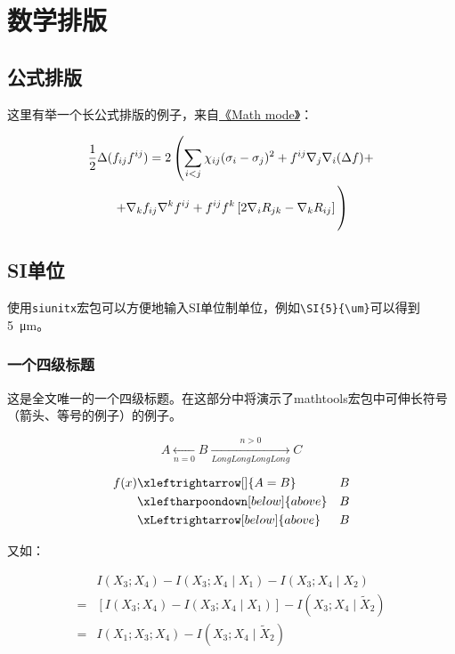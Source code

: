 \documentclass[doctor,openright,twoside]{sjtuthesis}
\theoremstyle{plain}
\theoremstyle{definition}
\theoremstyle{remark}
\theoremstyle{ocrenumbox}
\theoremstyle{plain}
\begin{document}
\section{数学排版}
\label{sec:matheq}

\subsection{公式排版}
\label{sec:eqformat}

这里有举一个长公式排版的例子，来自\href{http://www.tex.ac.uk/tex-archive/info/math/voss/mathmode/Mathmode.pdf}{《Math mode》}：

\begin {multline}
  \frac {1}{2}\Delta (f_{ij}f^{ij})=
  2\left (\sum _{i<j}\chi _{ij}(\sigma _{i}-
    \sigma _{j}) ^{2}+ f^{ij}\nabla _{j}\nabla _{i}(\Delta f)+\right .\\
  \left .+\nabla _{k}f_{ij}\nabla ^{k}f^{ij}+
    f^{ij}f^{k}\left [2\nabla _{i}R_{jk}-
      \nabla _{k}R_{ij}\right ]\vphantom {\sum _{i<j}}\right )
\end{multline}

\subsection{SI单位}

使用\verb+siunitx+宏包可以方便地输入SI单位制单位，例如\verb+\SI{5}{\um}+可以得到\SI{5}{\um}。

\subsubsection{一个四级标题}
\label{sec:depth4}

这是全文唯一的一个四级标题。在这部分中将演示了mathtools宏包中可伸长符号（箭头、等号的例子）的例子。

\begin{displaymath}
    A \xleftarrow[n=0]{} B \xrightarrow[LongLongLongLong]{n>0} C
\end{displaymath}

\begin{eqnarray}
  f(x) & \xleftrightarrow[]{A=B}  & B \\
  & \xleftharpoondown[below]{above} & B \nonumber \\
  & \xLeftrightarrow[below]{above} & B
\end{eqnarray}

又如：

\begin{align}
  \label{eq:none}
  & I(X_3;X_4)-I(X_3;X_4\mid{}X_1)-I(X_3;X_4\mid{}X_2) \nonumber \\
  = & [I(X_3;X_4)-I(X_3;X_4\mid{}X_1)]-I(X_3;X_4\mid{}\tilde{X}_2) \\
  = & I(X_1;X_3;X_4)-I(X_3;X_4\mid{}\tilde{X}_2)
\end{align}
\end{document}
